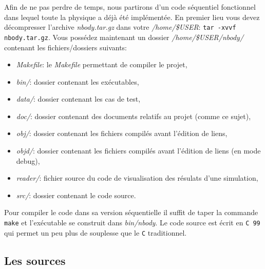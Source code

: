 Afin de ne pas perdre de temps, nous partirons d'un code séquentiel fonctionnel dans lequel toute la physique a déjà été implémentée.
En premier lieu vous devez décompresser l'archive \textit{nbody.tar.gz} dans votre \textit{/home/\$USER}:
\texttt{tar -xvvf nbody.tar.gz}.
Vous possédez maintenant un dossier \textit{/home/\$USER/nbody/} contenant les fichiers/dossiers suivants:
\begin{itemize}
	\item \textit{Makefile}: le \textit{Makefile} permettant de compiler le projet,
	\item \textit{bin/}: dossier contenant les exécutables,
	\item \textit{data/}: dossier contenant les cas de test,
	\item \textit{doc/}: dossier contenant des documents relatifs au projet (comme ce sujet),
	\item \textit{obj/}: dossier contenant les fichiers compilés avant l'édition de liens,
	\item \textit{objd/}: dossier contenant les fichiers compilés avant l'édition de liens (en mode debug),
	\item \textit{reader/}: fichier source du code de visualisation des résulats d'une simulation,
	\item \textit{src/}: dossier contenant le code source.
\end{itemize}
Pour compiler le code dans sa version séquentielle il suffit de taper la commande \texttt{make} et l'exécutable se construit dans \textit{bin/nbody}.
Le code source est écrit en \texttt{C 99} qui permet un peu plus de souplesse que le \texttt{C} traditionnel.

\subsection{Les sources}

